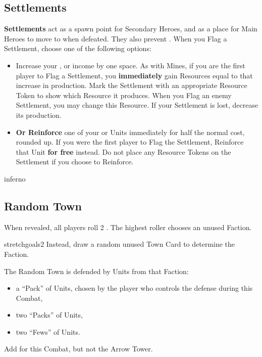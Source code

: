 \begin{multicols}{2}
\subsection*{Settlements}
\textbf{Settlements} act as a spawn point for Secondary Heroes, and as a place for Main Heroes to move to when defeated.
They also prevent .
When you Flag a Settlement, choose one of the following options:
\begin{itemize}
  \item Increase your ,  or  income by one space.
    As with Mines, if you are the first player to Flag a Settlement, you \textbf{immediately} gain Resources equal to that increase in production.
      Mark the Settlement with an appropriate Resource Token to show which Resource it produces.
      When you Flag an enemy Settlement, you may change this Resource.
      If your Settlement is lost, decrease its production.
  \item \textbf{Or Reinforce} one of your  or  Units immediately for half the normal cost, rounded up.
    If you were the first player to Flag the Settlement, Reinforce that Unit \textbf{for free} instead.
    Do not place any Resource Tokens on the Settlement if you choose to Reinforce.
\end{itemize}

\vspace*{\fill}
\columnbreak

\begin{expansion}[before=\vspace*{-11mm}]{inferno}
  \subsection*{Random Town}

  \medskip
  When revealed, all players roll 2 .
  The highest roller chooses an unused Faction.

  \medskip
  \begin{expansion}[left=-1mm]{stretchgoals2}
    Instead, draw a random unused Town Card to determine the Faction.
  \end{expansion}

  The Random Town is defended by Units from that Faction:
  \begin{itemize}
    \item a ``Pack'' of  Units, chosen by the player who controls the defense during this Combat,
    \item two ``Packs'' of  Units,
    \item two ``Fews'' of  Units.
  \end{itemize}
  Add  for this Combat, but not the Arrow Tower.
  \medskip


\end{expansion}
\end{multicols}
